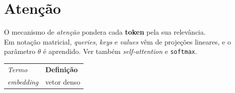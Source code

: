 \chapter{Atenção}\label{cap:atencao}
\renewcommand{\arraystretch}{1.2}

O mecanismo de \textit{atenção} pondera cada \textbf{token} pela sua relevância.\\
Em notação matricial, \textit{queries}, \textit{keys} e \textit{values} vêm de
projeções lineares, e o parâmetro $\theta$ é aprendido.\newline
\noindent Ver também \textit{self-attention} e \texttt{softmax}.

\begin{tabular}{ll}
\textit{Termo} & \textbf{Definição} \\
\textit{embedding} & vetor denso \\
\end{tabular}

